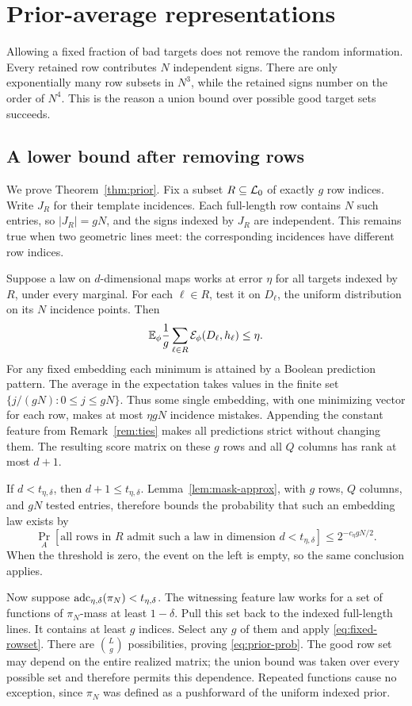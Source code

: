 \section{Prior-average representations}\label{app:prior}
Allowing a fixed fraction of bad targets does not remove the random information. Every retained row contributes $N$ independent signs. There are only exponentially many row subsets in $N^3$, while the retained signs number on the order of $N^4$. This is the reason a union bound over possible good target sets succeeds.

\subsection{A lower bound after removing rows}
We prove Theorem~\ref{thm:prior}. Fix a subset $R\subseteq\mathcal L_0$ of exactly $g$ row indices. Write $J_R$ for their template incidences. Each full-length row contains $N$ such entries, so $|J_R|=gN$, and the signs indexed by $J_R$ are independent. This remains true when two geometric lines meet: the corresponding incidences have different row indices.

Suppose a law on $d$-dimensional maps works at error $\eta$ for all targets indexed by $R$, under every marginal. For each $\ell\in R$, test it on $D_\ell$, the uniform distribution on its $N$ incidence points. Then
\[
 \mathbb E_\phi\frac1g\sum_{\ell\in R}\mathcal E_\phi(D_\ell,h_\ell)\le\eta.
\]
For any fixed embedding each minimum is attained by a Boolean prediction pattern. The average in the expectation takes values in the finite set $\{j/(gN):0\le j\le gN\}$. Thus some single embedding, with one minimizing vector for each row, makes at most $\eta gN$ incidence mistakes. Appending the constant feature from Remark~\ref{rem:ties} makes all predictions strict without changing them. The resulting score matrix on these $g$ rows and all $Q$ columns has rank at most $d+1$.

If $d<t_{\eta,\delta}$, then $d+1\le t_{\eta,\delta}$. Lemma~\ref{lem:mask-approx}, with $g$ rows, $Q$ columns, and $gN$ tested entries, therefore bounds the probability that such an embedding law exists by
\begin{equation}
 \Pr_A[\text{all rows in }R\text{ admit such a law in dimension }d<t_{\eta,\delta}]
 \le 2^{-c_\eta gN/2}.
 \label{eq:fixed-rowset}
\end{equation}
When the threshold is zero, the event on the left is empty, so the same conclusion applies.

Now suppose $\operatorname{adc}_{\eta,\delta}(\pi_N)<t_{\eta,\delta}$. The witnessing feature law works for a set of functions of $\pi_N$-mass at least $1-\delta$. Pull this set back to the indexed full-length lines. It contains at least $g$ indices. Select any $g$ of them and apply \eqref{eq:fixed-rowset}. There are $\binom{L}{g}$ possibilities, proving \eqref{eq:prior-prob}. The good row set may depend on the entire realized matrix; the union bound was taken over every possible set and therefore permits this dependence. Repeated functions cause no exception, since $\pi_N$ was defined as a pushforward of the uniform indexed prior.

